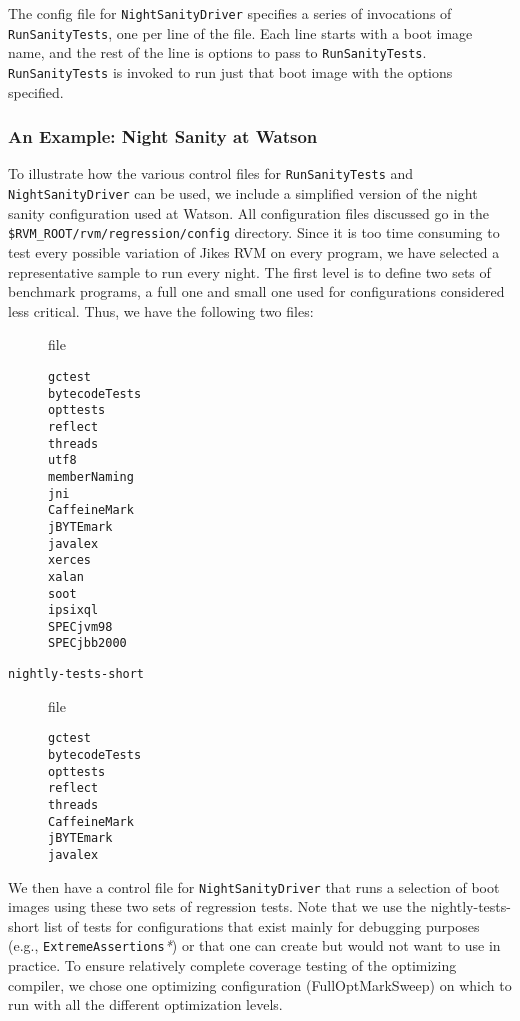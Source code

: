  The config file for {\tt{NightSanityDriver}} specifies a series of
invocations of {\tt{RunSanityTests}}, one per line of the file.  Each
line starts with a boot image name, and the rest of the line is
options to pass to {\tt{RunSanityTests}}.  {\tt{RunSanityTests}} is
invoked to run just that boot image with the options specified.

\subsubsection{An Example: Night Sanity at Watson}

 To illustrate how the various control files for {\tt{RunSanityTests}}
and {\tt{NightSanityDriver}} can be used, we include a simplified
version of the night sanity configuration used at Watson.  All
configuration files discussed go in the
{\tt \$RVM\_\-ROOT/rvm/regression/config} directory. Since it is
too time consuming to test every possible variation of Jikes RVM on
every program, we have selected a representative sample to run every
night.  The first level is to define two sets of benchmark programs, a
full one and small one used for configurations considered less
critical.  Thus, we have the following two files:

\begin{description}
\item[] file
\begin{verbatim}
gctest
bytecodeTests
opttests
reflect
threads
utf8
memberNaming
jni
CaffeineMark
jBYTEmark
javalex 
xerces
xalan
soot
ipsixql
SPECjvm98 
SPECjbb2000 
\end{verbatim}
\item[\texttt{nightly-tests-short}] file
\begin{verbatim}
gctest
bytecodeTests
opttests
reflect
threads
CaffeineMark
jBYTEmark
javalex 
\end{verbatim}
\end{description}

 We then have a control file for {\tt{NightSanityDriver}} that runs a
selection of boot images using these two sets of regression tests.
Note that we use the nightly-tests-short list of tests for
configurations that exist mainly for debugging purposes
(e.g., \texttt{ExtremeAssertions}\textit{*}) or that one can
create but would not want to use in practice.
To ensure relatively complete coverage testing of the optimizing
compiler, we chose one optimizing configuration (FullOptMarkSweep) on
which to run with all the different optimization levels.

